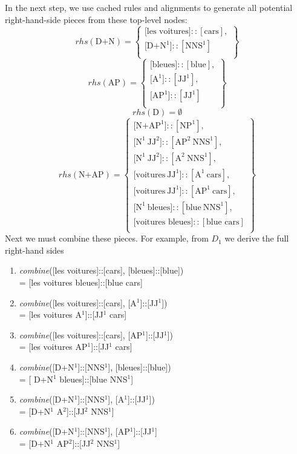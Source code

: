 \documentclass[11pt]{article}
\begin{document}
In the next step, we use cached rules and alignments to generate all potential right-hand-side pieces from these top-level nodes:
$$
rhs(\text{D+N}) = \left\{
    \begin{array}{l}
    \lbrack\text{les voitures}]::[\text{cars}], \\
    \lbrack\text{D+N}^1]::[\text{NNS}^1] \\
    \end{array} \right\}
$$
$$
rhs(\text{AP}) =  \left\{ 
    \begin{array}{l}
    \lbrack\text{bleues}]::[\text{blue}], \\
    \lbrack\text{A}^1]::[\text{JJ}^1], \\
    \lbrack\text{AP}^1]::[\text{JJ}^1] \\
    \end{array} \right\}
$$
$$
rhs(\text{D}) = \emptyset
$$
$$
rhs(\text{N+AP}) = \left\{
    \begin{array}{l}
    \lbrack\text{N+AP}^1]::[\text{NP}^1], \\
    \lbrack\text{N}^1\ \text{JJ}^2]::[\text{AP}^2\ \text{NNS}^1], \\
    \lbrack\text{N}^1\ \text{JJ}^2]::[\text{A}^2\ \text{NNS}^1], \\
    \lbrack\text{voitures}\ \text{JJ}^1]::[\text{A}^1\ \text{cars}], \\
    \lbrack\text{voitures}\ \text{JJ}^1]::[\text{AP}^1\ \text{cars}], \\
    \lbrack\text{N}^1\ \text{bleues}]::[\text{blue}\ \text{NNS}^1], \\
    \lbrack\text{voitures bleues}]::[\text{blue cars}] \\
    \end{array} \right\}
$$
Next we must combine these pieces. For example, from $D_1$ we derive the full right-hand sides
\begin{enumerate}
\item {\em combine}([les voitures]::[cars], [bleues]::[blue]) \\= [les voitures bleues]::[blue cars]
\item {\em combine}([les voitures]::[cars], [A$^1$]::[JJ$^1$]) \\= [les voitures A$^1$]::[JJ$^1$ cars]
\item {\em combine}([les voitures]::[cars], [AP$^1$]::[JJ$^1$]) \\= [les voitures AP$^1$]::[JJ$^1$ cars]
\item {\em combine}([D+N$^1$]::[NNS$^1$], [bleues]::[blue])\\ = [ D+N$^1$ bleues]::[blue NNS$^1$]
\item{\em combine}([D+N$^1$]::[NNS$^1$], [A$^1$]::[JJ$^1$])\\ = [D+N$^1$ A$^2$]::[JJ$^2$ NNS$^1$]
\item {\em combine}([D+N$^1$]::[NNS$^1$], [AP$^1$]::[JJ$^1$] \\= [D+N$^1$ AP$^2$]::[JJ$^2$ NNS$^1$]
\end{enumerate}
\end{document}
